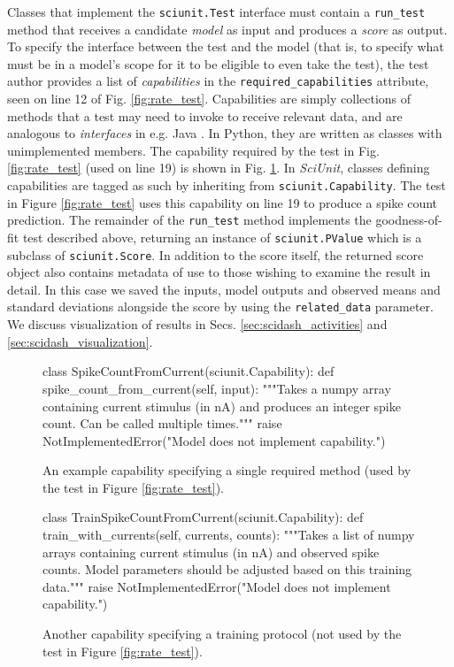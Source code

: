 \documentclass[11pt,letterpaper]{article}
\let\verbx\lstinline
\begin{document}
Classes that implement the \verbx{sciunit.Test} interface must contain a \verbx{run_test} method that receives a candidate \emph{model} as input and produces a \textit{score} as output. 
To specify the interface between the test and the model (that is, to specify what must be in a model's scope for it to be eligible to even take the test), the test author provides a list of \emph{capabilities} in the \verbx{required_capabilities} attribute, seen on line 12 of Fig. \ref{fig:rate_test}. 
Capabilities are simply collections of methods that a test may need to invoke to receive relevant data, and are analogous to \emph{interfaces} in e.g. Java \cite{java_interfaces_url}. 
In Python, they are written as classes with unimplemented members. 
The capability required by the test in Fig. \ref{fig:rate_test} (used on line 19) is shown in Fig. \ref{fig:capability}. 
In \textit{SciUnit}, classes defining capabilities are tagged as such by inheriting from \verbx{sciunit.Capability}. The test in Figure \ref{fig:rate_test} uses this capability on line 19 to produce a spike count prediction. The remainder of the \verbx{run_test} method implements the goodness-of-fit test described above, returning an instance of \verbx{sciunit.PValue} which is a subclass of \verbx{sciunit.Score}. In addition to the score itself, the returned score object also contains metadata of use to those wishing to examine the result in detail. 
In this case we saved the inputs, model outputs and observed means and standard deviations alongside the score by using the \verbx{related_data} parameter. 
We discuss visualization of results in Secs. \ref{sec:scidash_activities} and \ref{sec:scidash_visualization}.

\begin{figure}
\begin{python}
class SpikeCountFromCurrent(sciunit.Capability):
  def spike_count_from_current(self, input): 
    """Takes a numpy array containing current stimulus (in nA) and
    produces an integer spike count. Can be called multiple times."""
    raise NotImplementedError("Model does not implement capability.")
\end{python}
\caption{An example capability specifying a single required method (used by the test in Figure \ref{fig:rate_test}).}
\label{fig:capability}
\vspace{-10px}
\end{figure}

\begin{figure}
\begin{python}
class TrainSpikeCountFromCurrent(sciunit.Capability):
  def train_with_currents(self, currents, counts):
    """Takes a list of numpy arrays containing current stimulus (in nA) and
    observed spike counts. Model parameters should be adjusted based on this
    training data."""
    raise NotImplementedError("Model does not implement capability.")
\end{python}
\caption{Another capability specifying a training protocol (not used by the test in Figure \ref{fig:rate_test}).}
\label{fig:training}
\vspace{-15px}
\end{figure}
\end{document}
